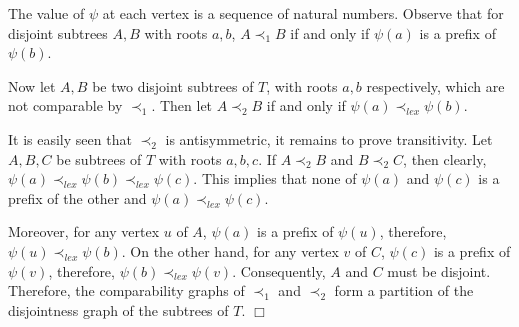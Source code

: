 \documentclass[12pt]{article}
\def\qed{\ifhmode\unskip\nobreak\fi\quad\ifmmode\Box\else$\Box$\fi}
\def\qed{\hfill $\Box$}
\begin{document}
The value of $\psi$ at each
vertex is a sequence of natural numbers.
Observe that for disjoint subtrees $A,B$ with roots $a,b$, $A \prec_1 B$ if and only if
$\psi(a)$ is a prefix of $\psi(b)$.

Now let $A,B$ be two disjoint subtrees of $T$, with roots $a,b$ respectively,
which are not comparable by $\prec_1$.
Then let $A \prec_2 B$ if and only if  $\psi(a)\prec_{lex} \psi(b)$.


It is easily seen that $\prec_2$ is antisymmetric, it remains to prove
transitivity. Let $A,B,C$ be subtrees of $T$ with roots
$a,b,c$. If $A\prec_2 B$ and
$B \prec_2 C$, then clearly, $\psi(a) \prec_{lex}\psi(b)\prec_{lex}\psi(c)$.
This  implies that none of $\psi(a)$ and $\psi(c)$ is a prefix of the other and
$\psi(a) \prec_{lex} \psi(c)$.

Moreover, for any vertex $u$ of $A$, $\psi(a)$ is a prefix of $\psi(u)$,
therefore, $\psi(u)\prec_{lex}\psi(b)$. On the other hand,
for any vertex $v$ of $C$, $\psi(c)$
is a prefix of $\psi(v)$, therefore, $\psi(b)\prec_{lex}\psi(v)$.
Consequently,
$A$ and $C$
must be disjoint.
Therefore, the comparability graphs of $\prec_1$ and $\prec_2$ form
a partition of the disjointness graph of the subtrees of $T$.   \qed
\end{document}
